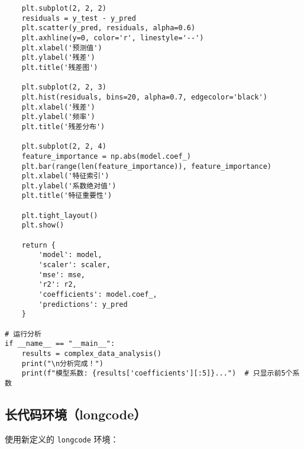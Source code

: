 \begin{verbatim}
    plt.subplot(2, 2, 2)
    residuals = y_test - y_pred
    plt.scatter(y_pred, residuals, alpha=0.6)
    plt.axhline(y=0, color='r', linestyle='--')
    plt.xlabel('预测值')
    plt.ylabel('残差')
    plt.title('残差图')
    
    plt.subplot(2, 2, 3)
    plt.hist(residuals, bins=20, alpha=0.7, edgecolor='black')
    plt.xlabel('残差')
    plt.ylabel('频率')
    plt.title('残差分布')
    
    plt.subplot(2, 2, 4)
    feature_importance = np.abs(model.coef_)
    plt.bar(range(len(feature_importance)), feature_importance)
    plt.xlabel('特征索引')
    plt.ylabel('系数绝对值')
    plt.title('特征重要性')
    
    plt.tight_layout()
    plt.show()
    
    return {
        'model': model,
        'scaler': scaler,
        'mse': mse,
        'r2': r2,
        'coefficients': model.coef_,
        'predictions': y_pred
    }

# 运行分析
if __name__ == "__main__":
    results = complex_data_analysis()
    print("\n分析完成！")
    print(f"模型系数: {results['coefficients'][:5]}...")  # 只显示前5个系数
\end{verbatim}

\subsection{长代码环境（longcode）}

使用新定义的 \texttt{longcode} 环境：

